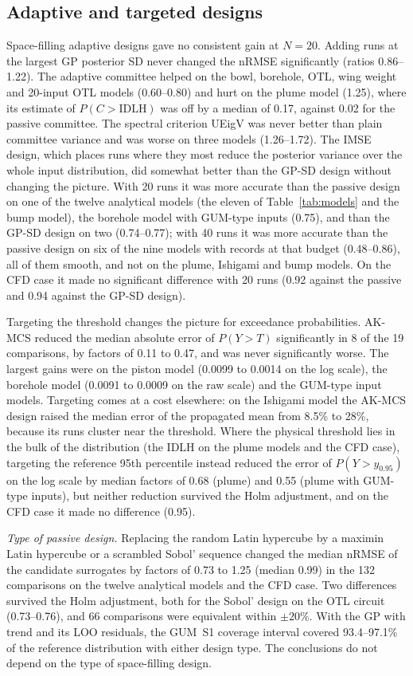 \subsection{Adaptive and targeted designs}
Space-filling adaptive designs gave no consistent gain at $N=20$. Adding
runs at the largest GP posterior SD never changed the nRMSE significantly
(ratios 0.86--1.22). The adaptive committee helped on the bowl, borehole,
OTL, wing weight and 20-input OTL models (0.60--0.80) and hurt on the
plume model (1.25), where its estimate of $P(C>\mathrm{IDLH})$ was off by a median of 0.17, against 0.02
for the passive committee. The spectral criterion UEigV was never better
than plain committee variance and was worse on three models (1.26--1.72).
The IMSE design, which places runs where they most reduce the posterior
variance over the whole input distribution, did somewhat better than the
GP-SD design without changing the picture. With 20 runs it was more
accurate than the passive design on one of the twelve analytical models
(the eleven of Table~\ref{tab:models} and the bump model), the borehole
model with GUM-type inputs (0.75), and than the GP-SD design on
two (0.74--0.77); with 40 runs it was more accurate than the passive design
on six of the nine models with records at that budget (0.48--0.86), all of
them smooth, and not on the plume, Ishigami and bump models. On the CFD case
it made no significant difference with 20 runs (0.92 against the passive
and 0.94 against the GP-SD design).

Targeting the threshold changes the picture for exceedance probabilities.
AK-MCS reduced the median absolute error of $P(Y>T)$ significantly in 8 of
the 19 comparisons, by factors of 0.11 to 0.47, and was never significantly
worse. The largest gains were on the piston model (0.0099 to 0.0014 on the
log scale), the borehole model (0.0091 to 0.0009 on the raw scale) and the
GUM-type input models. Targeting comes at a cost elsewhere: on the
Ishigami model the AK-MCS design raised the median error of the propagated
mean from 8.5\% to 28\%, because its runs cluster near the threshold.
Where the physical threshold lies in the bulk of the distribution (the
IDLH on the plume models and the CFD case), targeting the reference 95th
percentile instead reduced the error of $P(Y>y_{0.95})$ on the log scale by
median factors of 0.68 (plume) and 0.55 (plume with GUM-type inputs), but
neither reduction survived the Holm adjustment, and on the CFD case it made
no difference (0.95).

\emph{Type of passive design.} Replacing the random Latin hypercube by a
maximin Latin hypercube or a scrambled Sobol' sequence changed the median
nRMSE of the candidate surrogates by factors of 0.73 to 1.25 (median 0.99)
in the 132 comparisons on the twelve analytical models and the CFD case.
Two differences
survived the Holm adjustment, both for the Sobol' design on the OTL circuit
(0.73--0.76), and 66 comparisons were equivalent within $\pm20\%$. With the
GP with trend and its LOO residuals, the GUM~S1 coverage interval covered
93.4--97.1\% of the reference distribution with either design type. The
conclusions do not depend on the type of space-filling design.

